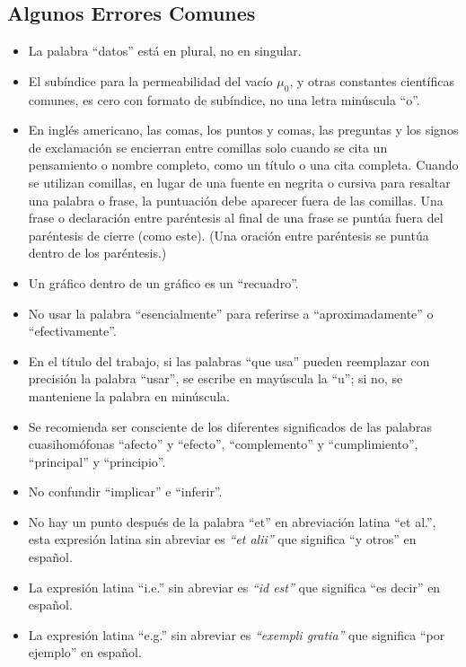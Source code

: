 \documentclass[letterpaper, 10pt, conference]{IEEEtran} %
\begin{document}
	\subsection{Algunos Errores Comunes} \label{subseccionAlgunosErroresComunes}
	\begin{itemize}
		\item La palabra ``datos'' está en plural, no en singular.
		\item El subíndice para la permeabilidad del vacío $\mu_{0}$, y otras constantes científicas comunes, es cero con formato de subíndice, no una letra minúscula ``o''.
		\item En inglés americano, las comas, los puntos y comas, las preguntas y los signos de exclamación se encierran entre comillas solo cuando se cita un pensamiento o nombre completo, como un título o una cita completa. Cuando se utilizan comillas, en lugar de una fuente en negrita o cursiva para resaltar una palabra o frase, la puntuación debe aparecer fuera de las comillas. Una frase o declaración entre paréntesis al final de una frase se puntúa fuera del paréntesis de cierre (como este). (Una oración entre paréntesis se puntúa dentro de los paréntesis.)
		\item Un gráfico dentro de un gráfico es un ``recuadro''.
		\item No usar la palabra ``esencialmente'' para referirse a ``aproximadamente'' o ``efectivamente''.
		\item En el título del trabajo, si las palabras ``que usa'' pueden reemplazar con precisión la palabra ``usar'', se escribe en mayúscula la ``u''; si no, se manteniene la palabra en minúscula.
		\item Se recomienda ser consciente de los diferentes significados de las palabras cuasihomófonas ``afecto'' y ``efecto'', ``complemento'' y ``cumplimiento'', ``principal'' y ``principio''.
		\item No confundir ``implicar'' e ``inferir''.
		\item No hay un punto después de la palabra ``et'' en abreviación latina ``et al.'', esta expresión latina sin abreviar es \emph{``et alii''} que significa ``y otros'' en español.
		\item La expresión latina ``i.e.'' sin abreviar es \emph{``id est''} que significa ``es decir'' en español.
		\item La expresión latina ``e.g.'' sin abreviar es \emph{``exempli gratia''} que significa ``por ejemplo'' en español.
	\end{itemize}
	
\end{document}
